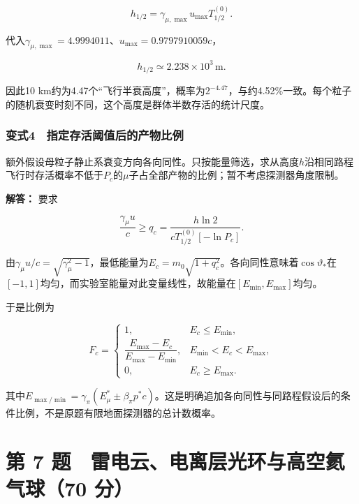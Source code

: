 \documentclass[12pt,a4paper,fontset=fandol]{ctexart}
\begin{document}
\[
\boxed{
h_{1/2}=\gamma_{\mu,\max}u_{\max}T_{1/2}^{(0)}}.
\]

代入\(\gamma_{\mu,\max}=4.9994011\)、\(u_{\max}=0.9797910059c\)，

\[
h_{1/2}\simeq2.238\times10^3\,\mathrm m.
\]

因此10
km约为4.47个``飞行半衰高度''，概率为\(2^{-4.47}\)，与约4.52\%一致。每个粒子的随机衰变时刻不同，这个高度是群体半数存活的统计尺度。

\par\noindent\begin{minipage}{\linewidth}
\subsubsection{变式4　指定存活阈值后的产物比例}\label{ux53d8ux5f0f4-ux6307ux5b9aux5b58ux6d3bux9608ux503cux540eux7684ux4ea7ux7269ux6bd4ux4f8b}

额外假设母粒子静止系衰变方向各向同性。只按能量筛选，求从高度\(h\)沿相同路程飞行时存活概率不低于\(P_c\)的\(\mu\)子占全部产物的比例；暂不考虑探测器角度限制。

\textbf{解答：} 要求

\[
\frac{\gamma_\mu u}{c}
\ge q_c=\frac{h\ln2}
{cT_{1/2}^{(0)}[-\ln P_c]}.
\]

由\(\gamma_\mu u/c=\sqrt{\gamma_\mu^2-1}\)，最低能量为\(E_c=m_0\sqrt{1+q_c^2}\)。各向同性意味着\(\cos\vartheta_*\)在\([-1,1]\)均匀，而实验室能量对此变量线性，故能量在\([E_{\min},E_{\max}]\)均匀。

于是比例为

\[
\boxed{
F_c=
\begin{cases}
1,&E_c\le E_{\min},\\
\dfrac{E_{\max}-E_c}{E_{\max}-E_{\min}},
&E_{\min}<E_c<E_{\max},\\
0,&E_c\ge E_{\max}.
\end{cases}}
\]

其中\(E_{\max/\min}=\gamma_\pi(E_\mu^*\pm\beta_\pi p^*c)\)。这是明确追加各向同性与同路程假设后的条件比例，不是原题有限地面探测器的总计数概率。

\end{minipage}\par
\clearpage

\section{第 7 题　雷电云、电离层光环与高空氦气球（70
分）}\label{ux7b2c-7-ux9898-ux96f7ux7535ux4e91ux7535ux79bbux5c42ux5149ux73afux4e0eux9ad8ux7a7aux6c26ux6c14ux740370-ux5206}
\end{document}
